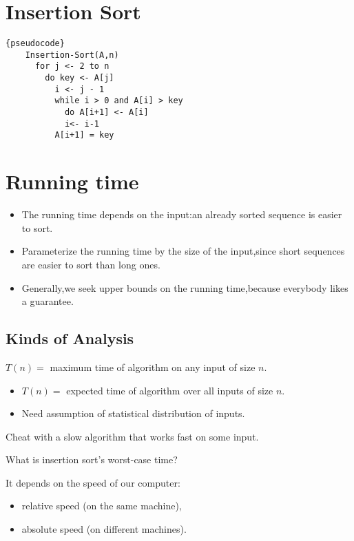 \documentclass[11pt]{elegantbook}
\begin{document}
\section{Insertion Sort}
\begin{lstlisting}{pseudocode}
    Insertion-Sort(A,n)
      for j <- 2 to n
        do key <- A[j]
          i <- j - 1
          while i > 0 and A[i] > key
            do A[i+1] <- A[i]
            i<- i-1
          A[i+1] = key
\end{lstlisting}


\section{Running time}

\begin{itemize}
  \item The running time depends on the input:an already sorted sequence is easier to sort.
  \item Parameterize the running time by the size of the input,since short sequences are easier to sort than long ones.
  \item Generally,we seek upper bounds on the running time,because everybody likes a guarantee.
\end{itemize}

\subsection{Kinds of Analysis}



\begin{definition}
  $T(n)=$ maximum time of algorithm on any input of size $n$.
\end{definition}
  
\begin{definition}
  \begin{itemize}
    \item $T(n)=$ expected time of algorithm over all inputs of size $n$.
    \item Need assumption of statistical distribution of inputs.
  \end{itemize}
  
\end{definition}
\begin{definition}
  Cheat with a slow algorithm that works fast on some input.
\end{definition}
\begin{note}
  What is insertion sort’s worst-case time?
\end{note}
It depends on the speed of our computer:
\begin{itemize}
  \item relative speed (on the same machine),
  \item absolute speed (on different machines).
\end{itemize}
\end{document}
